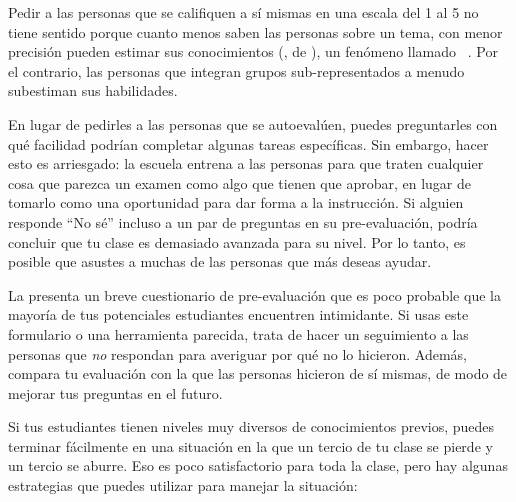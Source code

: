 Pedir a las personas que se califiquen a sí mismas en una escala del 1 al 5 no tiene sentido
porque cuanto menos saben las personas sobre un tema, 
con menor precisión pueden estimar sus conocimientos
(,
de ),
un fenómeno llamado  ~\cite{Krug1999}.
Por el contrario,
las personas que integran grupos sub-representados a menudo subestiman sus habilidades.


En lugar de pedirles a las personas que se autoevalúen,
puedes preguntarles con qué facilidad podrían completar algunas tareas específicas.
Sin embargo,
hacer esto es arriesgado:
la escuela entrena a las personas
para que traten cualquier cosa que parezca un examen como algo que tienen que aprobar,
en lugar de tomarlo como una oportunidad para dar forma a la instrucción.
Si alguien responde ``No sé'' incluso a un par de preguntas en su pre-evaluación,
podría concluir que tu clase es demasiado avanzada para su nivel.
Por lo tanto, es posible que asustes a muchas de las personas que más deseas ayudar.

La  presenta un breve cuestionario de pre-evaluación
que es poco probable que la mayoría de tus potenciales estudiantes encuentren intimidante.
Si usas este formulario o una herramienta parecida,
trata de hacer un seguimiento a las personas que \emph{no} respondan para averiguar por qué no lo hicieron. Además, compara tu evaluación con la que las personas hicieron de sí mismas,
de modo de mejorar tus preguntas en el futuro.


Si tus estudiantes tienen niveles muy diversos de conocimientos previos,
puedes terminar fácilmente en una situación en la que un tercio de tu clase se pierde
y un tercio se aburre.
Eso es poco satisfactorio para toda la clase,
pero hay algunas estrategias que puedes utilizar para manejar la situación:

